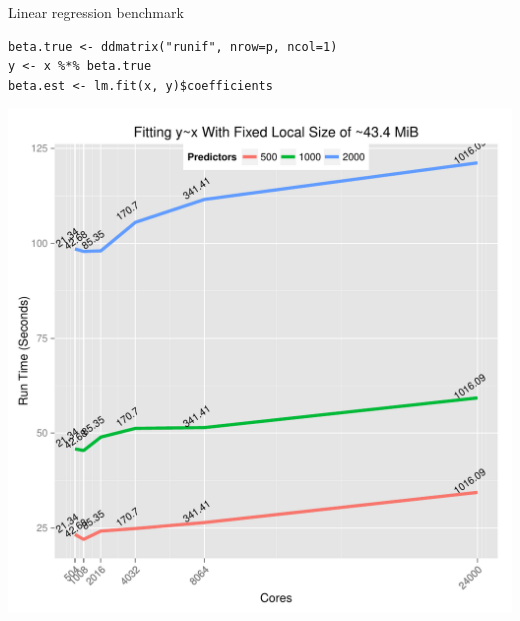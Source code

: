 \begin{frame}[fragile]
  \begin{block}{Linear regression benchmark}
    \vspace{-3ex}\scriptsize
    \begin{lstlisting}
beta.true <- ddmatrix("runif", nrow=p, ncol=1)
y <- x %*% beta.true
beta.est <- lm.fit(x, y)$coefficients
    \end{lstlisting} %
    \vspace{-3ex}
    \begin{center}
      \includegraphics[trim=3mm 1mm 2mm
      11mm,clip,height=.77\textheight]{../common/pics/benchmarks/lmfit2}
    \end{center}
  \end{block}
\end{frame}

